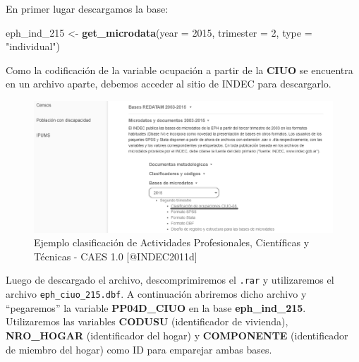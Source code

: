 \documentclass[
]{article}
\newenvironment{Shaded}{\begin{snugshade}}{\end{snugshade}}
\newcommand{\AttributeTok}[1]{\textcolor[rgb]{0.13,0.29,0.53}{#1}}
\newcommand{\DecValTok}[1]{\textcolor[rgb]{0.00,0.00,0.81}{#1}}
\newcommand{\FunctionTok}[1]{\textcolor[rgb]{0.13,0.29,0.53}{\textbf{#1}}}
\newcommand{\NormalTok}[1]{#1}
\newcommand{\OtherTok}[1]{\textcolor[rgb]{0.56,0.35,0.01}{#1}}
\newcommand{\StringTok}[1]{\textcolor[rgb]{0.31,0.60,0.02}{#1}}
\begin{document}
En primer lugar descargamos la base:

\begin{Shaded}
\begin{Highlighting}[]
\NormalTok{eph\_ind\_215 }\OtherTok{\textless{}{-}} \FunctionTok{get\_microdata}\NormalTok{(}\AttributeTok{year =} \DecValTok{2015}\NormalTok{, }\AttributeTok{trimester =} \DecValTok{2}\NormalTok{, }\AttributeTok{type =} \StringTok{"individual"}\NormalTok{)}
\end{Highlighting}
\end{Shaded}

Como la codificación de la variable ocupación a partir de la \textbf{CIUO} se encuentra en un archivo aparte, debemos acceder al sitio de INDEC para descargarlo.

\begin{figure}

{\centering \includegraphics[width=0.8\linewidth]{imagenes_byn/indec_ciuo} 

}

\caption{Ejemplo clasificación de Actividades Profesionales, Científicas y Técnicas - CAES 1.0 [@INDEC2011d]}\label{fig:unnamed-chunk-44}
\end{figure}

Luego de descargado el archivo, descomprimiremos el \texttt{.rar} y utilizaremos el archivo \texttt{eph\_ciuo\_215.dbf}. A continuación abriremos dicho archivo y ``pegaremos'' la variable \textbf{PP04D\_CIUO} en la base \textbf{eph\_ind\_215}. Utilizaremos las variables \textbf{CODUSU} (identificador de vivienda), \textbf{NRO\_HOGAR} (identificador del hogar) y \textbf{COMPONENTE} (identificador de miembro del hogar) como ID para emparejar ambas bases.
\end{document}
